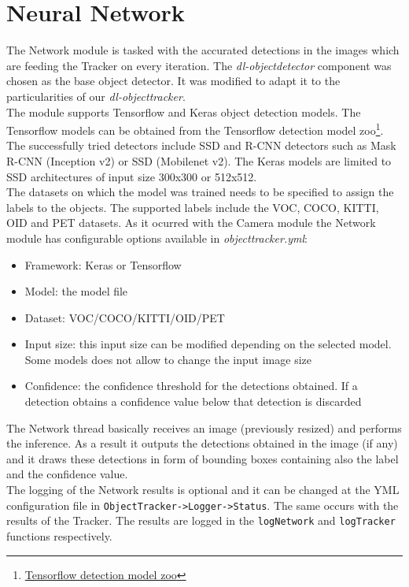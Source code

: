 \section{Neural Network} 
The Network module is tasked with the accurated detections in the images which are feeding the Tracker on every iteration. The \textit{dl-objectdetector} component was chosen as the base object detector. It was modified to adapt it to the particularities of our \textit{dl-objecttracker}.\\
The module supports Tensorflow and Keras object detection models. The Tensorflow models can be obtained from the Tensorflow detection model zoo\footnote{\href {https://github.com/tensorflow/models/blob/master/research/object_detection/g3doc/detection_model_zoo.md}{Tensorflow detection model zoo}}. The successfully tried detectors include SSD and R-CNN detectors such as Mask R-CNN (Inception v2) or SSD (Mobilenet v2). The Keras models are limited to SSD architectures of input size 300x300 or 512x512.\\
The datasets on which the model was trained needs to be specified to assign the labels to the objects. The supported labels include the VOC, COCO, KITTI, OID and PET datasets. As it ocurred with the Camera module the Network module has configurable options available in \textit{objecttracker.yml}:
\begin{itemize}
    \item Framework: Keras or Tensorflow
    \item Model: the model file
    \item Dataset: VOC/COCO/KITTI/OID/PET
    \item Input size: this input size can be modified depending on the selected model. Some models does not allow to change the input image size
    \item Confidence: the confidence threshold for the detections obtained. If a detection obtains a confidence value below that detection is discarded
\end{itemize}
The Network thread basically receives an image (previously resized) and performs the inference. As a result it outputs the detections obtained in the image (if any) and it draws these detections in form of bounding boxes containing also the label and the confidence value.\\
The logging of the Network results is optional and it can be changed at the YML configuration file in \texttt{ObjectTracker->Logger->Status}. The same occurs with the results of the Tracker. The results are logged in the \texttt{logNetwork} and \texttt{logTracker} functions respectively.
